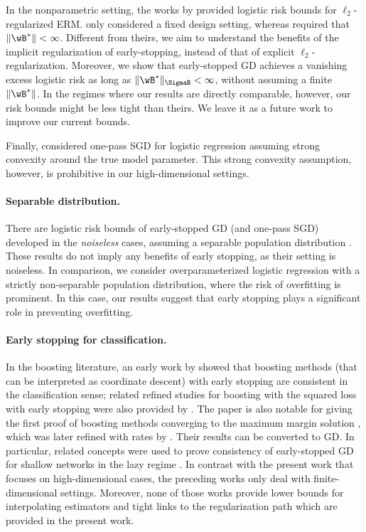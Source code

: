 \documentclass[11pt]{article}
\begin{document}
In the nonparametric setting, the works by \citep{bach2010self,marteau2019beyond} provided logistic risk bounds for $\ell_2$-regularized ERM. 
\citet{bach2010self} only considered a fixed design setting, whereas \citet{marteau2019beyond} required that $\|\wB^*\|<\infty$. 
Different from theirs, we aim to understand the benefits of the implicit regularization of early-stopping, instead of that of explicit $\ell_2$-regularization.
Moreover, we show that early-stopped GD achieves a vanishing excess logistic risk as long as $\|\wB^*\|_{\SigmaB}<\infty$, without assuming a finite $\|\wB^*\|$. In the regimes where our results are directly comparable, however, our risk bounds might be less tight than theirs. We leave it as a future work to improve our current bounds.

Finally, \citet{bach2014adaptivity} considered one-pass SGD for logistic regression assuming strong convexity around the true model parameter.
This strong convexity assumption, however, is prohibitive in our high-dimensional settings. 



\paragraph{Separable distribution.}
There are logistic risk bounds of early-stopped GD (and one-pass SGD) developed in the \emph{noiseless} cases, assuming a separable population distribution \citep{ji2018risk,shamir2021gradient,telgarsky2022stochastic,schliserman2024tight}. 
These results do not imply any benefits of early stopping, as their setting is noiseless. 
In comparison, we consider overparameterized logistic regression with a strictly non-separable population distribution, where the risk of overfitting is prominent.
In this case, our results suggest that early stopping plays a significant role in preventing overfitting.

\paragraph{Early stopping for classification.}  
In the boosting literature, an early work by \citet{zhang2005boosting}
showed that boosting methods (that can be interpreted as coordinate descent) with early stopping
are consistent in the classification sense;
related refined studies for boosting with the squared loss with
early stopping were also provided by \citet{buhlmann2003boosting}.  
The paper is also notable for giving the first proof of boosting methods converging to the maximum margin solution \citep[Appendix D]{zhang2005boosting}, which was later
refined with rates by \citep{telgarsky2013margins}. 
Their results can be converted to GD.
In particular, related concepts were used to prove consistency
of early-stopped GD for shallow networks in the lazy regime \citep{ji2021early}.
In contrast with the present work that focuses on high-dimensional cases, the preceding works only deal with finite-dimensional settings.  Moreover, none of those works provide lower bounds for interpolating estimators and tight links to the regularization path which are provided in the present work.
\end{document}
